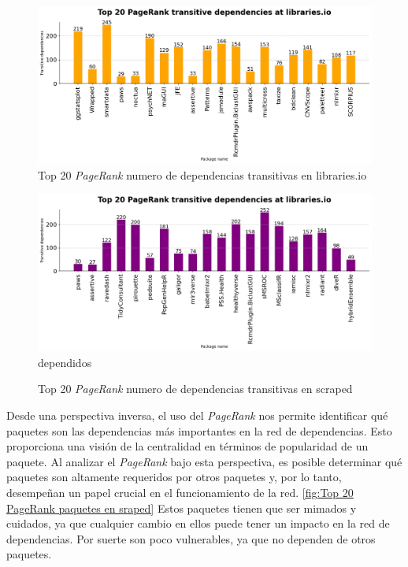 \begin{figure}[ht!]
    \begin{center}
        \includegraphics[width=1\textwidth]{img/cran/pr_trans.png}
        \caption{Top 20 \textit{PageRank} numero de dependencias transitivas en libraries.io}
        \label{fig:Top 20 PageRank numero de dependencias transitivas en libraries.io}
    \end{center}
\end{figure}

\begin{figure}[ht!]
    \begin{center}
        \includegraphics[width=1\textwidth]{img/cran/pr_trans2.png}dependidos
        \caption{Top 20 \textit{PageRank} numero de dependencias transitivas en scraped}
        \label{fig:Top 20 PageRank numero de dependencias transitivas en scraped}
    \end{center}
\end{figure}

Desde una perspectiva inversa, el uso del \textit{PageRank} nos permite identificar qué paquetes son las dependencias
más importantes en la red de dependencias. Esto proporciona una visión de
la centralidad en términos de popularidad de un paquete. Al analizar el \textit{PageRank} bajo esta perspectiva, es
posible determinar qué paquetes son altamente requeridos por otros paquetes y, por lo tanto,
desempeñan un papel crucial en el funcionamiento de la red. \ref{fig:Top 20 PageRank paquetes en sraped}
Estos paquetes tienen que ser mimados y cuidados, ya que cualquier cambio en ellos puede tener un impacto
en la red de dependencias. Por suerte son poco vulnerables, ya que no dependen de otros paquetes.

